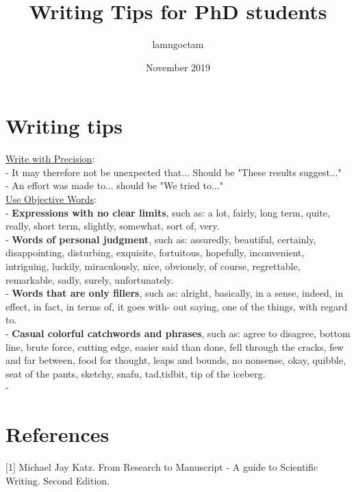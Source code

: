 \documentclass{article}
\title{Writing Tips for PhD students}
\author{lamngoctam }
\date{November 2019}
\begin{document}
\maketitle

\section{Writing tips}
\uline{Write with Precision}: \\
- It may therefore not be unexpected that... Should be "These results suggest..."\\
- An effort was made to... should be "We tried to..."\\

\noindent\uline{Use Objective Words}: \\
- \textbf{Expressions with no clear limits}, such as: a lot, fairly, long term, quite, really, short term, slightly, somewhat, sort of,
very.\\

-\textbf{ Words of personal judgment}, such as: assuredly, beautiful, certainly, disappointing, disturbing, exquisite, fortuitous,
hopefully, inconvenient, intriguing, luckily, miraculously, nice, obviously, of course, regrettable, remarkable, sadly, surely, unfortunately.\\

- \textbf{Words that are only fillers}, such as: alright, basically, in a sense, indeed, in effect, in fact, in terms of, it goes with-
out saying, one of the things, with regard to.\\

- \textbf{Casual colorful catchwords and phrases}, such as: agree to disagree, bottom line, brute force, cutting edge, easier said than done, fell through the cracks, few and far between, food for thought, leaps and bounds, no nonsense, okay, quibble, seat of the pants, sketchy, snafu, tad,tidbit, tip of the iceberg.\\

- 

\section{References}
[1] Michael Jay Katz. From Research to Manuscript - A guide to Scientific Writing. Second Edition.


\cleardoublepage
\printbibliography
\end{document}
